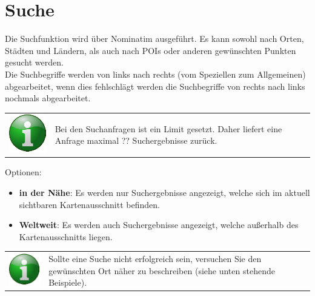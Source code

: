\documentclass[10pt]{scrreprt}
\begin{document}

\vspace{3mm}
\section{Suche} 
Die Suchfunktion wird über Nominatim  ausgeführt. Es kann sowohl nach Orten, Städten und Ländern, als auch nach POIs oder anderen gewünschten Punkten gesucht werden.\\

Die Suchbegriffe werden von links nach rechts (vom Speziellen zum Allgemeinen) abgearbeitet, wenn dies fehlschlägt werden die Suchbegriffe von rechts nach links nochmals abgearbeitet.\\

\vspace{3mm}
\begin{tabular}{>{\centering \arraybackslash}m{1cm} m{14cm}}
\includegraphics[scale=0.5]{images/info.eps} & Bei den Suchanfragen ist ein Limit gesetzt. Daher liefert eine Anfrage maximal ?? Suchergebnisse zurück. \\ 
\end{tabular} 

\vspace{5mm}
Optionen:
\begin{itemize}
\item \textbf{in der Nähe}: Es werden nur Suchergebnisse angezeigt, welche sich im aktuell sichtbaren Kartenausschnitt befinden.
\item \textbf{Weltweit}: Es werden auch Suchergebnisse angezeigt, welche außerhalb des Kartenausschnitts liegen.
\end{itemize}


\vspace{3mm}
\begin{tabular}{>{\centering \arraybackslash}m{1cm} m{14cm}}
\includegraphics[scale=0.5]{images/info.eps} & Sollte eine Suche nicht erfolgreich sein, versuchen Sie den gewünschten Ort näher zu beschreiben (siehe unten stehende Beispiele). \\ 
\end{tabular}
\end{document}
